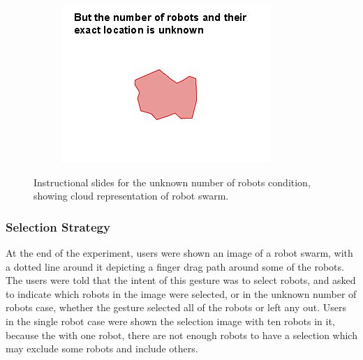 \begin{figure}
\begin{subfigure}{0.3\textwidth}
		\includegraphics[width=\linewidth]{../ui_experiment/slide_images/Swarm_Robot_Control_-_Unknown_Number_of_Robots_0003.png}
	\end{subfigure}
	\caption{Instructional slides for the unknown number of robots condition, showing cloud representation of robot swarm.}
	\label{instructional_slides}
\end{figure}

\subsubsection{Selection Strategy} \label{section:Selection_Strategy}

At the end of the experiment, users were shown an image of a robot swarm, with a dotted line around it depicting a finger drag path around some of the robots. 
The users were told that the intent of this gesture was to select robots, and asked to indicate which robots in the image were selected, or in the unknown number of robots case, whether the gesture selected all of the robots or left any out. 
Users in the single robot case were shown the selection image with ten robots in it, because the with one robot, there are not enough robots to have a selection which may exclude some robots and include others. 

